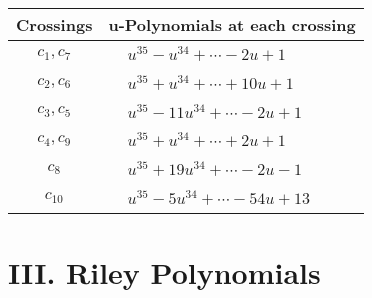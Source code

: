 \documentclass[1p]{elsarticle_modified}
\theoremstyle{definition}
\begin{document}
\begin{tabular}{m{50pt}|m{274pt}}
Crossings & \hspace{64pt}u-Polynomials at each crossing \\
\hline $$\begin{aligned}c_{1},c_{7}\end{aligned}$$&$\begin{aligned}
&u^{35}- u^{34}+\cdots-2 u+1
\end{aligned}$\\
\hline $$\begin{aligned}c_{2},c_{6}\end{aligned}$$&$\begin{aligned}
&u^{35}+u^{34}+\cdots+10 u+1
\end{aligned}$\\
\hline $$\begin{aligned}c_{3},c_{5}\end{aligned}$$&$\begin{aligned}
&u^{35}-11 u^{34}+\cdots-2 u+1
\end{aligned}$\\
\hline $$\begin{aligned}c_{4},c_{9}\end{aligned}$$&$\begin{aligned}
&u^{35}+u^{34}+\cdots+2 u+1
\end{aligned}$\\
\hline $$\begin{aligned}c_{8}\end{aligned}$$&$\begin{aligned}
&u^{35}+19 u^{34}+\cdots-2 u-1
\end{aligned}$\\
\hline $$\begin{aligned}c_{10}\end{aligned}$$&$\begin{aligned}
&u^{35}-5 u^{34}+\cdots-54 u+13
\end{aligned}$\\
\hline
\end{tabular}\newpage\renewcommand{\arraystretch}{1}
\centering \section*{ III. Riley Polynomials}
\end{document}
